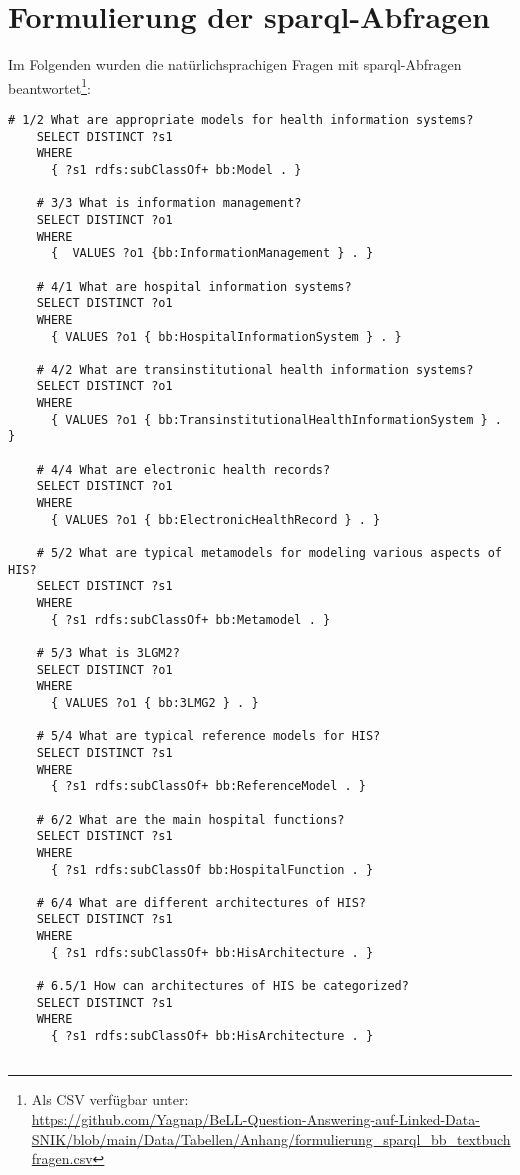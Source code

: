 \section[Formulierung der SPARQL-Abfragen]{Formulierung der \ac{sparql}-Abfragen}\label{sub:sparqltextbuchfragen}

Im Folgenden wurden die natürlichsprachigen Fragen mit \ac{sparql}-Abfragen beantwortet\footnote{Als CSV verfügbar unter:\\\url{https://github.com/Yagnap/BeLL-Question-Answering-auf-Linked-Data-SNIK/blob/main/Data/Tabellen/Anhang/formulierung\_sparql\_bb\_textbuchfragen.csv}}:

\begin{lstlisting}[language=SPARQL]
    # 1/2 What are appropriate models for health information systems?
    SELECT DISTINCT ?s1
    WHERE
      { ?s1 rdfs:subClassOf+ bb:Model . }
    
    # 3/3 What is information management?
    SELECT DISTINCT ?o1
    WHERE
      {  VALUES ?o1 {bb:InformationManagement } . }
    
    # 4/1 What are hospital information systems?
    SELECT DISTINCT ?o1
    WHERE
      { VALUES ?o1 { bb:HospitalInformationSystem } . }
    
    # 4/2 What are transinstitutional health information systems?
    SELECT DISTINCT ?o1
    WHERE
      { VALUES ?o1 { bb:TransinstitutionalHealthInformationSystem } . }
    
    # 4/4 What are electronic health records?
    SELECT DISTINCT ?o1
    WHERE
      { VALUES ?o1 { bb:ElectronicHealthRecord } . }
    
    # 5/2 What are typical metamodels for modeling various aspects of HIS?
    SELECT DISTINCT ?s1
    WHERE
      { ?s1 rdfs:subClassOf+ bb:Metamodel . }
    
    # 5/3 What is 3LGM2?
    SELECT DISTINCT ?o1
    WHERE
      { VALUES ?o1 { bb:3LMG2 } . }
    
    # 5/4 What are typical reference models for HIS?
    SELECT DISTINCT ?s1
    WHERE
      { ?s1 rdfs:subClassOf+ bb:ReferenceModel . }
    
    # 6/2 What are the main hospital functions?
    SELECT DISTINCT ?s1
    WHERE
      { ?s1 rdfs:subClassOf bb:HospitalFunction . }
    
    # 6/4 What are different architectures of HIS?
    SELECT DISTINCT ?s1
    WHERE
      { ?s1 rdfs:subClassOf+ bb:HisArchitecture . }
    
    # 6.5/1 How can architectures of HIS be categorized?
    SELECT DISTINCT ?s1
    WHERE
      { ?s1 rdfs:subClassOf+ bb:HisArchitecture . }
    

\end{lstlisting}
